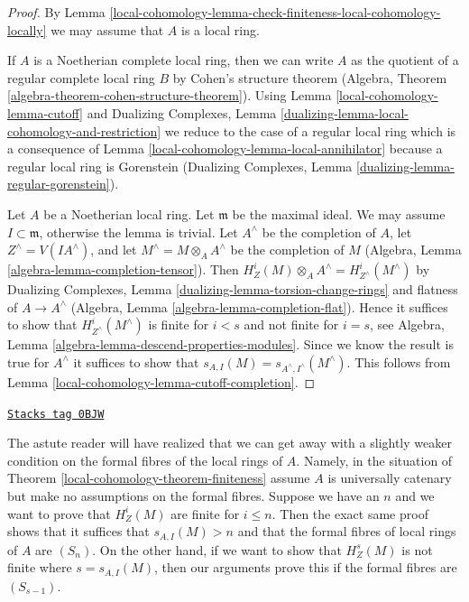 \begin{proof}
By Lemma \ref{local-cohomology-lemma-check-finiteness-local-cohomology-locally}
we may assume that $A$ is a local ring.

\medskip\noindent
If $A$ is a Noetherian complete local ring, then we can write $A$
as the quotient of a regular complete local ring $B$ by
Cohen's structure theorem
(Algebra, Theorem \ref{algebra-theorem-cohen-structure-theorem}).
Using Lemma \ref{local-cohomology-lemma-cutoff} and
Dualizing Complexes, Lemma
\ref{dualizing-lemma-local-cohomology-and-restriction}
we reduce to the case
of a regular local ring which is a consequence of
Lemma \ref{local-cohomology-lemma-local-annihilator}
because a regular local ring is Gorenstein
(Dualizing Complexes, Lemma \ref{dualizing-lemma-regular-gorenstein}).

\medskip\noindent
Let $A$ be a Noetherian local ring. Let $\mathfrak m$ be the maximal ideal.
We may assume $I \subset \mathfrak m$, otherwise the lemma is trivial.
Let $A^\wedge$ be the completion of $A$, let $Z^\wedge = V(IA^\wedge)$, and
let $M^\wedge = M \otimes_A A^\wedge$ be the completion of $M$
(Algebra, Lemma \ref{algebra-lemma-completion-tensor}).
Then $H^i_Z(M) \otimes_A A^\wedge = H^i_{Z^\wedge}(M^\wedge)$ by
Dualizing Complexes, Lemma \ref{dualizing-lemma-torsion-change-rings}
and flatness of $A \to A^\wedge$
(Algebra, Lemma \ref{algebra-lemma-completion-flat}).
Hence it suffices to show that $H^i_{Z^\wedge}(M^\wedge)$ is
finite for $i < s$ and not finite for $i = s$, see
Algebra, Lemma \ref{algebra-lemma-descend-properties-modules}.
Since we know the result is true for $A^\wedge$ it suffices
to show that $s_{A, I}(M) = s_{A^\wedge, I^\wedge}(M^\wedge)$.
This follows from Lemma \ref{local-cohomology-lemma-cutoff-completion}.
\end{proof}

\begin{remark}
\label{local-cohomology-remark-astute-reader}
\href{https://stacks.math.columbia.edu/tag/0BJW}{\texttt{Stacks tag 0BJW}}

The astute reader will have realized that we can get away with a
slightly weaker condition on the formal fibres of the local rings
of $A$. Namely, in the situation of Theorem \ref{local-cohomology-theorem-finiteness}
assume $A$ is universally catenary but make no assumptions on
the formal fibres. Suppose we have an $n$ and we want to prove that
$H^i_Z(M)$ are finite for $i \leq n$. Then the exact same proof
shows that it suffices that $s_{A, I}(M) > n$ and that
the formal fibres of local rings of $A$ are $(S_n)$.
On the other hand, if we want to show that $H^s_Z(M)$
is not finite where $s = s_{A, I}(M)$, then our arguments prove
this if the formal fibres are $(S_{s - 1})$.
\end{remark}

